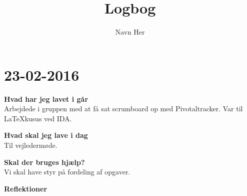 \documentclass{article}
\title{Logbog}
\author{Navn Her}
\date{}
\begin{document}
	\maketitle
	\tableofcontents
	
	\section{23-02-2016}
	
	\textbf{Hvad har jeg lavet i går}\\
	Arbejdede i gruppen med at få sat scrumboard op med Pivotaltracker.
	Var til LaTeXkusus ved IDA.
	
	\textbf{Hvad skal jeg lave i dag}\\
	Til vejledermøde. 
	
	\textbf{Skal der bruges hjælp?}\\
	Vi skal have styr på fordeling af opgaver.
	
	\textbf{Reflektioner}
\end{document}
